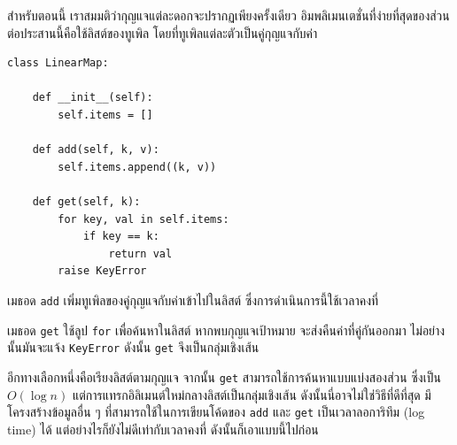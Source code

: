 
สำหรับตอนนี้ เราสมมติว่ากุญแจแต่ละดอกจะปรากฏเพียงครั้งเดียว 
อิมพลิเมนเตชั่นที่ง่ายที่สุดของส่วนต่อประสานนี้คือใช้ลิสต์ของทูเพิล โดยที่ทูเพิลแต่ละตัวเป็นคู่กุญแจกับค่า

\begin{verbatim}
class LinearMap:

    def __init__(self):
        self.items = []

    def add(self, k, v):
        self.items.append((k, v))

    def get(self, k):
        for key, val in self.items:
            if key == k:
                return val
        raise KeyError
\end{verbatim}

เมธอด {\tt add} เพิ่มทูเพิลของคู่กุญแจกับค่าเข้าไปในลิสต์ ซึ่งการดำเนินการนี้ใช้เวลาคงที่

เมธอด {\tt get} ใช้ลูป {\tt for} เพื่อค้นหาในลิสต์ หากพบกุญแจเป้าหมาย จะส่งคืนค่าที่คู่กันออกมา
ไม่อย่างนั้นมันจะแจ้ง {\tt KeyError} 
ดังนั้น {\tt get} จึงเป็นกลุ่มเชิงเส้น

อีกทางเลือกหนึ่งคือเรียงลิสต์ตามกุญแจ 
จากนั้น {\tt get} สามารถใช้การค้นหาแบบแบ่งสองส่วน ซึ่งเป็น {\scriptsize$O(\log n)$} 
แต่การแทรกอิลิเมนต์ใหม่กลางลิสต์เป็นกลุ่มเชิงเส้น 
ดังนั้นนี่อาจไม่ใช่วิธีที่ดีที่สุด 
มีโครงสร้างข้อมูลอื่น ๆ ที่สามารถใช้ในการเขียนโค้ดของ {\tt   add} 
และ {\tt get} เป็นเวลาลอการิทึม (log time) ได้ 
แต่อย่างไรก็ยังไม่ดีเท่ากับเวลาคงที่
ดังนั้นก็เอาแบบนี้ไปก่อน


